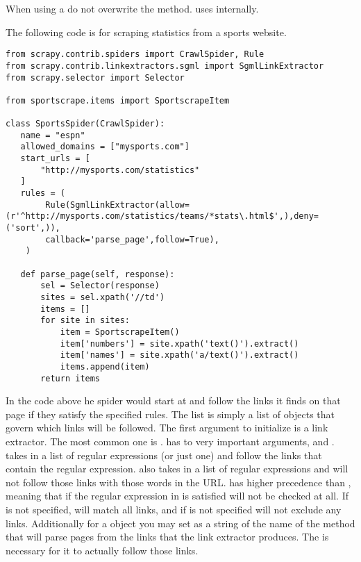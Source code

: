 \begin{warn}
When using a  do not overwrite the  method. 
 uses  internally.
\end{warn}

The following code is for scraping statistics from a sports website.
\begin{lstlisting}
from scrapy.contrib.spiders import CrawlSpider, Rule
from scrapy.contrib.linkextractors.sgml import SgmlLinkExtractor
from scrapy.selector import Selector

from sportscrape.items import SportscrapeItem

class SportsSpider(CrawlSpider):
   name = "espn"
   allowed_domains = ["mysports.com"]
   start_urls = [
       "http://mysports.com/statistics"
   ]
   rules = (
        Rule(SgmlLinkExtractor(allow=(r'^http://mysports.com/statistics/teams/*stats\.html$',),deny=('sort',)),
        callback='parse_page',follow=True),
    )

   def parse_page(self, response):
       sel = Selector(response)
       sites = sel.xpath('//td')
       items = []
       for site in sites:
           item = SportscrapeItem()
           item['numbers'] = site.xpath('text()').extract()
           item['names'] = site.xpath('a/text()').extract()
           items.append(item)
       return items
\end{lstlisting}
In the code above he spider would start at  and follow the links it finds on that page if they satisfy the specified rules. 
The  list is simply a list of  objects that govern which links will be followed. 
The first argument to initialize  is a link extractor.
The most common one is .
 has to very important arguments,  and . 
 takes in a list of regular expressions (or just one) and follow the links that contain the regular expression. 
 also takes in a list of regular expressions and will not follow those links with those words in the URL. 
 has higher precedence than , meaning that if the regular expression in  is satisfied  will not be checked at all. 
If  is not specified,  will match all links, and if  is not specified  will not exclude any links. 
Additionally for a  object you may set  as a string of the name of the method that will parse pages from the links that the link extractor produces. 
The  is necessary for it to actually follow those links.

